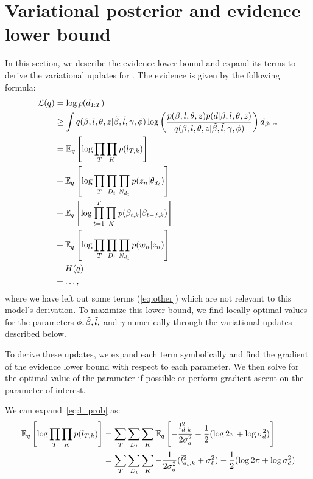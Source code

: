 \section{Variational posterior and evidence lower bound}
\label{sec:docinf_appendix}
In this section, we describe the evidence lower bound and expand its
terms to derive the variational updates for .  The
evidence is given by the following formula:
\begin{align}
\label{eq:supplementary_docinf_elbo}
\mathcal{L}(q) &= \log p(\textbf{$d_{1:T}$}) \\
            &\ge \int q( \beta, l, \theta, z | \tilde{\beta}, \tilde{l}, \gamma, \phi)
                    \log \left(\frac{p(\beta, l, \theta, z)
		                     p(d | \beta, l, \theta, z)}
			 {q( \beta, l, \theta, z | \tilde{\beta}, \tilde{l}, \gamma, \phi)}
                    \right)
		    d_{\beta_{1:T}} \\
            & = \mathbb{E}_q\left[ \log \prod_T \prod_K p(l_{T,k}) \right] \label{eq:l_prob} \\
            & + \mathbb{E}_q\left[ \log \prod_T \prod_{D_t} \prod_{N_{d_t}} p(z_n | \theta_{d_t}) \right] \label{eq:z_prob} \\
            & + \mathbb{E}_q\left[ \log \prod_{t=1}^T \prod_K p(\beta_{t,k}
                                 		      | \beta_{t-f,k}) \right]
    \label{eq:beta_prob} \\
            & + \mathbb{E}_q\left[ \log \prod_T \prod_{D_t} \prod_{N_{d_t}} p(w_n | z_n) \right] \label{eq:w_prob} \\
            & + H(q) \\
            & + \ldots \label{eq:other},
\end{align}
where we have left out some terms (\ref{eq:other}) which are not
relevant to this model's derivation.  To maximize this lower bound, we
find locally optimal values for the parameters $\phi, \tilde{\beta}, \tilde{l},$ and
$\gamma$ numerically through the variational updates described below.

To derive these updates, we expand each term symbolically and find the
gradient of the evidence lower bound with respect to each parameter.
We then solve for the optimal value of the parameter if possible or
perform gradient ascent on the parameter of interest.  

We can expand~\ref{eq:l_prob} as:
\begin{align}
  \mathbb{E}_q\left[ \log \prod_T \prod_K p(l_{T,k}) \right]
  & = \sum_T \sum_{D_t} \sum_K \mathbb{E}_q\left[-\frac{l_{d_,k}^2}{2 \sigma^2_{d}} - \frac{1}{2} (\log 2 \pi + \log \sigma^2_{d}) \right]  \\ \nonumber
  & = \sum_T \sum_{D_t} \sum_K -\frac{1}{2 \sigma^2_{d}} (\tilde{l}_{d_t,k}^2 + {\sigma^2_{\ell}}) - \frac{1}{2} (\log 2 \pi + \log \sigma^2_{d}) \nonumber
\end{align}

